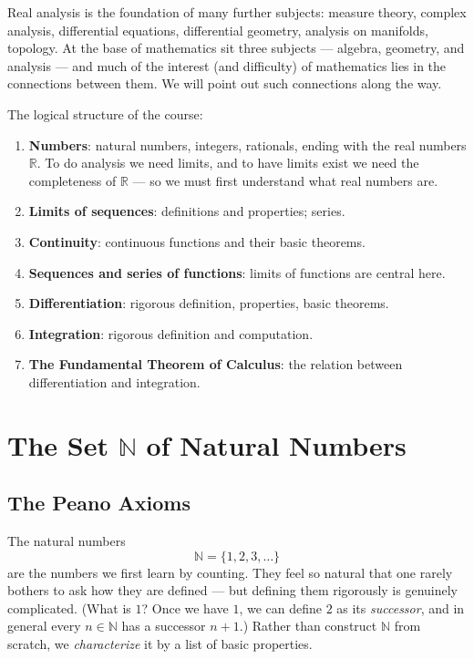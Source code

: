 \documentclass[11pt]{report}
\begin{document}
Real analysis is the foundation of many further subjects: measure theory, complex analysis, differential equations, differential geometry, analysis on manifolds, topology. At the base of mathematics sit three subjects --- algebra, geometry, and analysis --- and much of the interest (and difficulty) of mathematics lies in the connections between them. We will point out such connections along the way.

The logical structure of the course:
\begin{enumerate}[label=(\arabic*)]
    \item \textbf{Numbers}: natural numbers, integers, rationals, ending with the real numbers $\mathbb{R}$. To do analysis we need limits, and to have limits exist we need the completeness of $\mathbb{R}$ --- so we must first understand what real numbers are.
    \item \textbf{Limits of sequences}: definitions and properties; series.
    \item \textbf{Continuity}: continuous functions and their basic theorems.
    \item \textbf{Sequences and series of functions}: limits of functions are central here.
    \item \textbf{Differentiation}: rigorous definition, properties, basic theorems.
    \item \textbf{Integration}: rigorous definition and computation.
    \item \textbf{The Fundamental Theorem of Calculus}: the relation between differentiation and integration.
\end{enumerate}


\section{The Set $\mathbb{N}$ of Natural Numbers}

\subsection{The Peano Axioms}

The natural numbers
\[
\mathbb{N} = \{1, 2, 3, \ldots\}
\]
are the numbers we first learn by counting. They feel so natural that one rarely bothers to ask how they are defined --- but defining them rigorously is genuinely complicated. (What is $1$? Once we have $1$, we can define $2$ as its \emph{successor}, and in general every $n \in \mathbb{N}$ has a successor $n+1$.) Rather than construct $\mathbb{N}$ from scratch, we \emph{characterize} it by a list of basic properties.
\end{document}
